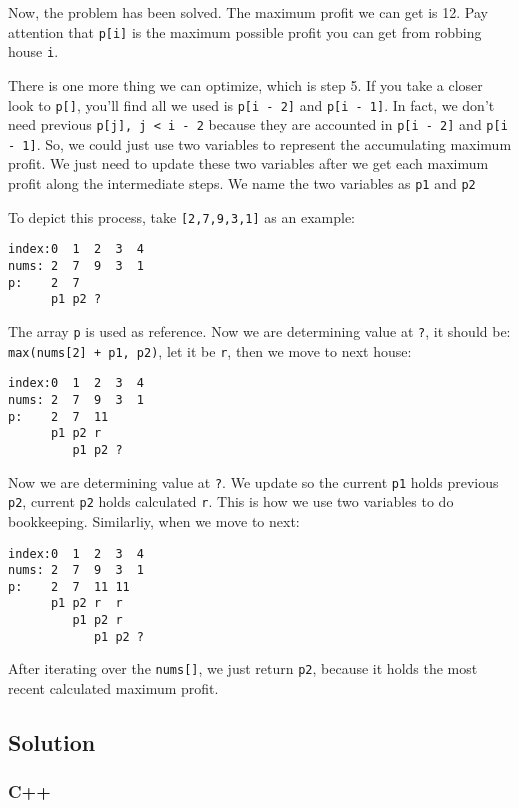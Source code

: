 \documentclass[11pt]{article}
\begin{document}
Now, the problem has been solved. The maximum profit we can get is 12. Pay attention that \texttt{p[i]} is the maximum possible profit you can get from robbing house \texttt{i}.

There is one more thing we can optimize, which is step 5. If you take a closer look to \texttt{p[]}, you'll find all we used is \texttt{p[i - 2]} and \texttt{p[i - 1]}. In fact, we don't need previous \texttt{p[j], j < i - 2} because they are accounted in \texttt{p[i - 2]} and \texttt{p[i - 1]}. So, we could just use two variables to represent the accumulating maximum profit. We just need to update these two variables after we get each maximum profit along the intermediate steps. We name the two variables as \texttt{p1} and \texttt{p2}

To depict this process, take \texttt{[2,7,9,3,1]} as an example:
\begin{Verbatim}[frame=single]
index:0  1  2  3  4
nums: 2  7  9  3  1
p:    2  7
      p1 p2 ?
\end{Verbatim}
The array \texttt{p} is used as reference. Now we are determining value at \texttt{?}, it should be: \texttt{max(nums[2] + p1, p2)}, let it be \texttt{r}, then we move to next house:
\begin{Verbatim}[frame=single]
index:0  1  2  3  4
nums: 2  7  9  3  1
p:    2  7  11
      p1 p2 r
         p1 p2 ?
\end{Verbatim}
Now we are determining value at \texttt{?}. We update so the current \texttt{p1} holds previous \texttt{p2}, current \texttt{p2} holds calculated \texttt{r}. This is how we use two variables to do bookkeeping. Similarliy, when we move to next:
\begin{Verbatim}[frame=single]
index:0  1  2  3  4
nums: 2  7  9  3  1
p:    2  7  11 11
      p1 p2 r  r
         p1 p2 r
            p1 p2 ?
\end{Verbatim}

After iterating over the \texttt{nums[]}, we just return \texttt{p2}, because it holds the most recent calculated maximum profit.

\subsection{Solution}
\label{sec:org86a7128}
\subsubsection{C++}
\label{sec:orga4d973f}
\end{document}
